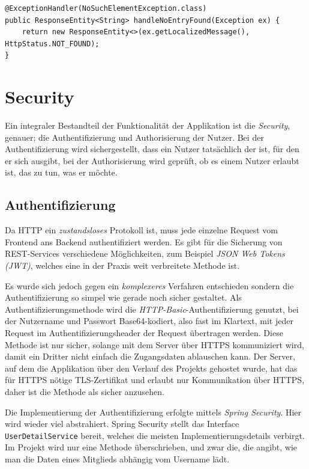 \documentclass[a4paper, 11pt]{article}
\begin{document}
\begin{lstlisting}[caption=Globales Handling der NoSuchElementException, label=lst_exc]
@ExceptionHandler(NoSuchElementException.class)
public ResponseEntity<String> handleNoEntryFound(Exception ex) {
    return new ResponseEntity<>(ex.getLocalizedMessage(), HttpStatus.NOT_FOUND);
}
\end{lstlisting}

\section{Security}

Ein integraler Bestandteil der Funktionalität der Applikation ist die
\emph{Security}, genauer; die Authentifizierung und Authorisierung der Nutzer.
Bei der Authentifizierung wird sichergestellt, dass ein Nutzer tatsächlich der
ist, für den er sich ausgibt, bei der Authorisierung wird geprüft, ob es einem
Nutzer erlaubt ist, das zu tun, was er möchte.

\subsection{Authentifizierung}

Da HTTP ein \emph{zustandsloses} Protokoll ist, muss jede einzelne Request vom
Frontend ans Backend authentifiziert werden. Es gibt für die Sicherung von
REST-Services verschiedene Möglichkeiten, zum Beispiel \emph{JSON Web Tokens
(JWT)}, welches eine in der Praxis weit verbreitete Methode ist.

Es wurde sich jedoch gegen ein \emph{komplexeres} Verfahren entschieden sondern
die Authentifizierung so simpel wie gerade noch sicher gestaltet. Als
Authentifizierungsmethode wird die \emph{HTTP-Basic}-Authentifizierung genutzt,
bei der Nutzername und Passwort Base64-kodiert, also fast im Klartext, mit
jeder Request im Authentifizierungsheader der Request übertragen werden. Diese
Methode ist nur sicher, solange mit dem Server über HTTPS kommuniziert wird,
damit ein Dritter nicht einfach die Zugangsdaten ablauschen kann. Der Server,
auf dem die Applikation über den Verlauf des Projekts gehostet wurde, hat das
für HTTPS nötige TLS-Zertifikat und erlaubt nur Kommunikation über HTTPS, daher
ist die Methode als sicher anzusehen.

Die Implementierung der Authentifizierung erfolgte mittels \emph{Spring
Security}. Hier wird wieder viel abstrahiert. Spring Security stellt das
Interface \lstinline{UserDetailService} bereit, welches die meisten
Implementierungsdetails verbirgt. Im Projekt wird nur eine Methode
überschrieben, und zwar die, die angibt, wie man die Daten eines Mitglieds
abhängig vom Username lädt.
\end{document}
